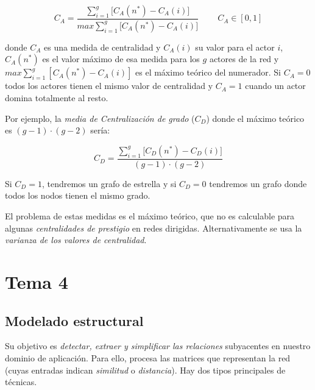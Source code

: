 \documentclass[10pt,spanish, landscape, twocolumn]{article}
\begin{document}
\begin{enumerate}[\color{tematres}{$\star$}]
\begin{enumerate}[---]
        \begin{displaymath}
            C_A = \frac{\sum_{i=1}^g \bigg[C_A (n^*) - C_A (i) \bigg]}{max \sum_{i=1}^g \bigg[C_A (n^*) - C_A (i) \bigg]} \qquad\ C_A \in [0,1]
        \end{displaymath}

        donde $C_A$ es una medida de centralidad y $C_A(i)$ su valor para el actor $i$, $C_A(n^*)$ es el valor máximo de esa medida para los $g$ actores de la red y $max \sum_{i=1}^g [C_A (n^*) - C_A (i) ]$ es el máximo teórico del numerador. Si $C_A = 0$ todos los actores tienen el mismo valor de centralidad y $C_A = 1$ cuando un actor domina totalmente al resto.

        Por ejemplo, la \textit{\textcolor{tematres}{media de Centralización de grado}} ($C_D$) donde el máximo teórico es $(g-1) \cdot (g-2)$ sería:

        \begin{displaymath}
            C_D = \frac{\sum_{i=1}^g \bigg[C_D (n^*) - C_D (i) \bigg]}{(g-1) \cdot (g-2)} 
        \end{displaymath}

        Si $C_D = 1$, tendremos un grafo de estrella y si $C_D = 0$ tendremos un grafo donde todos los nodos tienen el mismo grado.

        El problema de estas medidas es el máximo teórico, que no es calculable para algunas \textit{\textcolor{tematres}{centralidades de prestigio}} en redes dirigidas. Alternativamente se usa la \textit{\textcolor{tematres}{varianza de los valores de centralidad}}.
    \end{enumerate}

\end{enumerate}

\newpage
\section{\textcolor{temacuatro}{Tema 4}}
\subsection{\textcolor{temacuatro}Modelado estructural}
Su objetivo es \textit{\textcolor{temacuatro}{detectar, extraer y simplificar las relaciones}} subyacentes en nuestro dominio de aplicación. Para ello, procesa las matrices que representan la red (cuyas entradas indican \textit{\textcolor{temacuatro}{similitud}} o \textit{\textcolor{temacuatro}{distancia}}). Hay dos tipos principales de técnicas.
\end{document}
